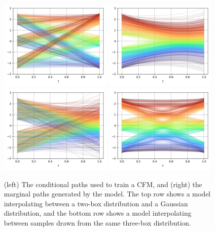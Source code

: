 \begin{figure}[ht]
    \centering
    \includegraphics[width=0.49\textwidth]{Figures/generative_models/oned2.png}
    \includegraphics[width=0.49\textwidth]{Figures/generative_models/oned.png}
    \includegraphics[width=0.49\textwidth]{Figures/generative_models/oned_target.png}
    \includegraphics[width=0.49\textwidth]{Figures/generative_models/oned2_marginal.png}
    \caption{(left) The conditional paths used to train a CFM, and (right) the marginal paths generated by the model. The top row shows a model interpolating between a two-box distribution and a Gaussian distribution, and the bottom row shows a model interpolating between samples drawn from the same three-box distribution.}
    \label{fig:oned_oned}
\end{figure}

